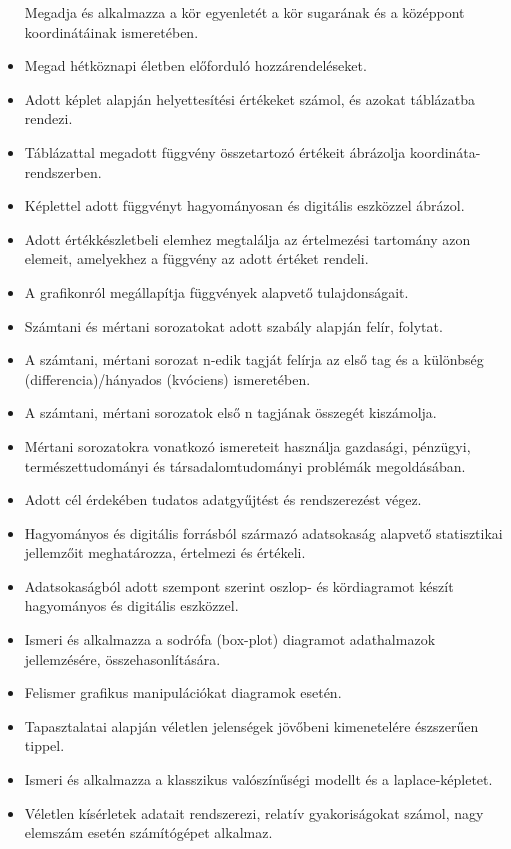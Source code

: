 \begin{itemize}
  Megadja és alkalmazza a kör egyenletét a kör sugarának és a középpont
  koordinátáinak ismeretében.
\item
  Megad hétköznapi életben előforduló hozzárendeléseket.
\item
  Adott képlet alapján helyettesítési értékeket számol, és azokat
  táblázatba rendezi.
\item
  Táblázattal megadott függvény összetartozó értékeit ábrázolja
  koordináta-rendszerben.
\item
  Képlettel adott függvényt hagyományosan és digitális eszközzel
  ábrázol.
\item
  Adott értékkészletbeli elemhez megtalálja az értelmezési tartomány
  azon elemeit, amelyekhez a függvény az adott értéket rendeli.
\item
  A grafikonról megállapítja függvények alapvető tulajdonságait.
\item
  Számtani és mértani sorozatokat adott szabály alapján felír, folytat.
\item
  A számtani, mértani sorozat n-edik tagját felírja az első tag és a
  különbség (differencia)/hányados (kvóciens) ismeretében.
\item
  A számtani, mértani sorozatok első n tagjának összegét kiszámolja.
\item
  Mértani sorozatokra vonatkozó ismereteit használja gazdasági,
  pénzügyi, természettudományi és társadalomtudományi problémák
  megoldásában.
\item
  Adott cél érdekében tudatos adatgyűjtést és rendszerezést végez.
\item
  Hagyományos és digitális forrásból származó adatsokaság alapvető
  statisztikai jellemzőit meghatározza, értelmezi és értékeli.
\item
  Adatsokaságból adott szempont szerint oszlop- és kördiagramot készít
  hagyományos és digitális eszközzel.
\item
  Ismeri és alkalmazza a sodrófa (box-plot) diagramot adathalmazok
  jellemzésére, összehasonlítására.
\item
  Felismer grafikus manipulációkat diagramok esetén.
\item
  Tapasztalatai alapján véletlen jelenségek jövőbeni kimenetelére
  észszerűen tippel.
\item
  Ismeri és alkalmazza a klasszikus valószínűségi modellt és a
  laplace-képletet.
\item
  Véletlen kísérletek adatait rendszerezi, relatív gyakoriságokat
  számol, nagy elemszám esetén számítógépet alkalmaz.

\end{itemize}
